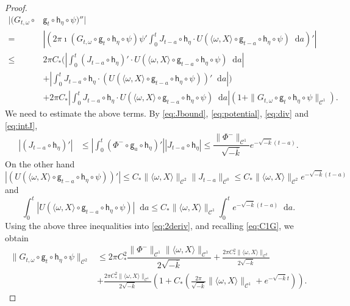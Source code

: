 \documentclass[11pt,letterpaper]{amsart}
\newcommand \cC {{\mathscr{C}}}
\newcommand{\horo}{\mathsf{h}}
\newcommand{\geo}{\mathsf{g}}
\newcommand*{\diff}{\mathop{}\!\mathrm{d}}
\theoremstyle{definition}
\begin{document}
\begin{proof}
\begin{equation}\label{eq:2deriv}
\begin{split}
|(G_{t,\omega}\circ & \geo_t\circ \horo_\eta \circ \psi)''|\\
%
=&\left|\left( 2\pi\imath (G_{t,\omega}\circ \geo_t\circ \horo_\eta\circ \psi)\psi' \int_0^t J_{t-a}\circ \horo_\eta \cdot U(\langle \omega, X \rangle\circ \geo_{t-a}\circ \horo_\eta\circ \psi )\diff a \right)'\right|\\
%
\le & 2\pi C_* \bigg( \left| \int_0^t (J_{t-a}\circ \horo_\eta)' \cdot U(\langle \omega, X \rangle\circ \geo_{t-a}\circ \horo_\eta\circ \psi )\diff a \right|\\
%
&+ \left| \int_0^t J_{t-a}\circ \horo_\eta \cdot (U(\langle \omega, X \rangle\circ \geo_{t-a}\circ \horo_\eta\circ \psi ))'\diff a \right|\bigg)\\
%
&+2\pi C_*  \left| \int_0^t J_{t-a}\circ \horo_\eta \cdot U(\langle \omega, X \rangle\circ \geo_{t-a}\circ \horo_\eta\circ \psi )\diff a \right|(1+\|G_{t,\omega}\circ \geo_t\circ \horo_\eta\circ \psi\|_{\cC^1}).
\end{split}
\end{equation}
We need to estimate the above terms. By \eqref{eq:Jbound}, \eqref{eq:potential}, \eqref{eq:div} and \eqref{eq:intJ},
\[
\begin{split}
\left| (J_{t-a}\circ {\horo_\eta})' \right| &\le \left| \int_0^t (\Phi^{-} \circ \geo_a\circ \horo_\eta)' \right|\left| J_{t-a}\circ \horo_\eta \right|\le  \dfrac{\|\Phi^{-} \|_{\cC^1}}{\sqrt{-\overline k}}e^{-\sqrt{-\overline k}(t-a)}.
\end{split}
\]
On the other hand
\[
\left| (U(\langle \omega, X \rangle\circ \geo_{t-a}\circ \horo_\eta\circ \psi ))'\right| \le C_*\|\langle \omega, X \rangle\|_{\cC^2}\|J_{t-a}\|_{\cC^0}\le C_*\|\langle \omega, X \rangle\|_{\cC^2}e^{-\sqrt{-\overline k}(t-a)}
\]
and
\[
\int_0^t |U(\langle \omega, X \rangle\circ \geo_{t-a}\circ \horo_\eta\circ \psi )|\diff a \le C_*\|\langle \omega, X \rangle\|_{\cC^1}\int_0^t e^{-\sqrt{-\overline k}(t-a)}\diff a.
\]
Using the above three inequalities into \eqref{eq:2deriv}, and recalling \eqref{eq:C1G}, we obtain
\[
\begin{split}
\|G_{t,\omega}\circ  \geo_t\circ \horo_\eta \circ \psi\|_{\cC^2}&\le 2\pi C_*^2 \dfrac{\|\Phi^{-} \|_{\cC^1}\|\langle \omega, X \rangle\|_{\cC^1}}{2{\sqrt{-\overline k}}} + \frac{2\pi C_*^2\|\langle \omega, X \rangle\|_{\cC^2}}{2\sqrt{-\overline k}}\\
%
&+\frac{2\pi C_*^2\|\langle \omega, X \rangle\|_{\cC^1}}{2\sqrt{-\overline k}}\left(1+C_*\left(\frac{2\pi  }{\sqrt{-\overline k}}\|\langle \omega, X \rangle \|_{\cC^1} +e^{-\sqrt{-\overline k}t}\right)\right).

\end{split}\]
\end{proof}
\end{document}
